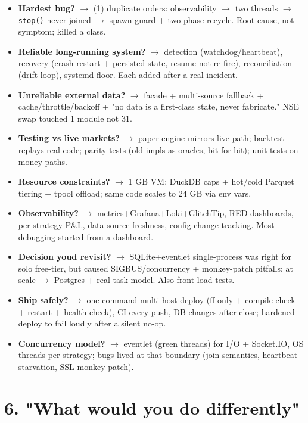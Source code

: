 \documentclass[11pt]{article}
\providecommand{\tightlist}{\setlength{\itemsep}{1pt}\setlength{\parskip}{0pt}}
\begin{document}
\begin{itemize}
\tightlist
\item
  \textbf{Hardest bug?} \(\rightarrow\) (1) duplicate orders: observability \(\rightarrow\) two threads \(\rightarrow\) \texttt{stop()} never joined \(\rightarrow\) spawn guard + two-phase recycle. Root cause, not symptom; killed a class.
\item
  \textbf{Reliable long-running system?} \(\rightarrow\) detection (watchdog/heartbeat), recovery (crash-restart + persisted state, resume not re-fire), reconciliation (drift loop), systemd floor. Each added after a real incident.
\item
  \textbf{Unreliable external data?} \(\rightarrow\) facade + multi-source fallback + cache/throttle/backoff + "no data is a first-class state, never fabricate." NSE swap touched 1 module not 31.
\item
  \textbf{Testing vs live markets?} \(\rightarrow\) paper engine mirrors live path; backtest replays real code; parity tests (old impls as oracles, bit-for-bit); unit tests on money paths.
\item
  \textbf{Resource constraints?} \(\rightarrow\) 1 GB VM: DuckDB caps + hot/cold Parquet tiering + tpool offload; same code scales to 24 GB via env vars.
\item
  \textbf{Observability?} \(\rightarrow\) metrics+Grafana+Loki+GlitchTip, RED dashboards, per-strategy P\&L, data-source freshness, config-change tracking. Most debugging started from a dashboard.
\item
  \textbf{Decision you\textquotesingle d revisit?} \(\rightarrow\) SQLite+eventlet single-process was right for solo free-tier, but caused SIGBUS/concurrency + monkey-patch pitfalls; at scale \(\rightarrow\) Postgres + real task model. Also front-load tests.
\item
  \textbf{Ship safely?} \(\rightarrow\) one-command multi-host deploy (ff-only + compile-check + restart + health-check), CI every push, DB changes after close; hardened deploy to fail loudly after a silent no-op.
\item
  \textbf{Concurrency model?} \(\rightarrow\) eventlet (green threads) for I/O + Socket.IO, OS threads per strategy; bugs lived at that boundary (join semantics, heartbeat starvation, SSL monkey-patch).
\end{itemize}

\section{6. "What would you do differently"}\label{6-what-would-you-do-differently}
\end{document}
